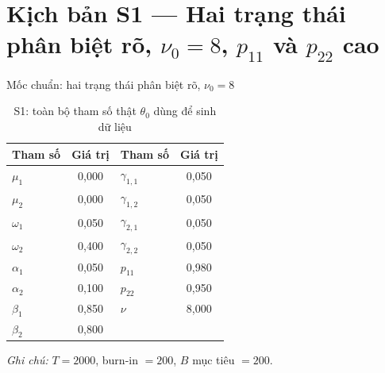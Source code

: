 \documentclass[11pt,a4paper]{article}
\begin{document}
\newpage
\section*{Kịch bản S1 --- Hai trạng thái phân biệt rõ, $\nu_0=8$, $p_{11}$ và $p_{22}$ cao}
Mốc chuẩn: hai trạng thái phân biệt rõ, $\nu_0=8$

\begin{table}[H]\centering\small
\caption{S1: toàn bộ tham số thật $\theta_0$ dùng để sinh dữ liệu}
\begin{tabularx}{\textwidth}{l C  l C}
\toprule
\textbf{Tham số} & \textbf{Giá trị} & \textbf{Tham số} & \textbf{Giá trị} \\
\midrule
$\mu_1$ & 0{,}000 & $\gamma_{1,1}$ & 0{,}050 \\
$\mu_2$ & 0{,}000 & $\gamma_{1,2}$ & 0{,}050 \\
$\omega_1$ & 0{,}050 & $\gamma_{2,1}$ & 0{,}050 \\
$\omega_2$ & 0{,}400 & $\gamma_{2,2}$ & 0{,}050 \\
$\alpha_1$ & 0{,}050 & $p_{11}$ & 0{,}980 \\
$\alpha_2$ & 0{,}100 & $p_{22}$ & 0{,}950 \\
$\beta_1$ & 0{,}850 & $\nu$ & 8{,}000 \\
$\beta_2$ & 0{,}800 & & \\
\bottomrule
\end{tabularx}
\vspace{0.2em}\raggedright\scriptsize \emph{Ghi chú:} $T=2000$, burn-in $=200$, $B$ mục tiêu $=200$.
\end{table}
\end{document}
